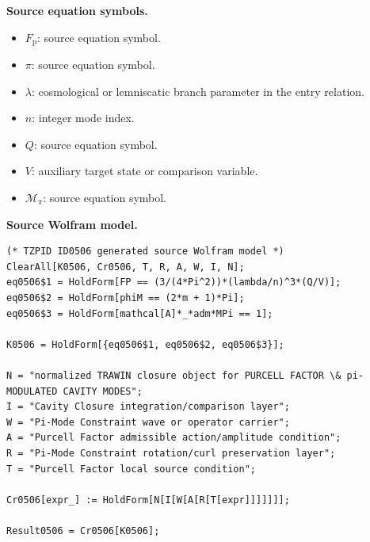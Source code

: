 \begin{minipage}[t]{0.49\linewidth}
\begingroup
\small
\raggedright
\textbf{Source equation symbols.}\par
\begin{itemize}[leftmargin=1.35em,itemsep=1pt,topsep=1pt,parsep=0pt]
    \item $F_{\mathrm{p}}$: source equation symbol.
    \item $\pi$: source equation symbol.
    \item $\lambda$: cosmological or lemniscatic branch parameter in the entry relation.
    \item $n$: integer mode index.
    \item $Q$: source equation symbol.
    \item $V$: auxiliary target state or comparison variable.
    \item $\mathcal{M}_{\pi}$: source equation symbol.
\end{itemize}
\endgroup
\end{minipage}\hfill
\begin{minipage}[t]{0.47\linewidth}
\begingroup
\scriptsize
\raggedright
\textbf{Source Wolfram model.}\par
\begin{Verbatim}[fontsize=\tiny,breaklines=true,breakanywhere=true]
(* TZPID ID0506 generated source Wolfram model *)
ClearAll[K0506, Cr0506, T, R, A, W, I, N];
eq0506$1 = HoldForm[FP == (3/(4*Pi^2))*(lambda/n)^3*(Q/V)];
eq0506$2 = HoldForm[phiM == (2*m + 1)*Pi];
eq0506$3 = HoldForm[mathcal[A]*_*adm*MPi == 1];

K0506 = HoldForm[{eq0506$1, eq0506$2, eq0506$3}];

N = "normalized TRAWIN closure object for PURCELL FACTOR \& pi-MODULATED CAVITY MODES";
I = "Cavity Closure integration/comparison layer";
W = "Pi-Mode Constraint wave or operator carrier";
A = "Purcell Factor admissible action/amplitude condition";
R = "Pi-Mode Constraint rotation/curl preservation layer";
T = "Purcell Factor local source condition";

Cr0506[expr_] := HoldForm[N[I[W[A[R[T[expr]]]]]]];

Result0506 = Cr0506[K0506];
\end{Verbatim}
\endgroup
\end{minipage}

